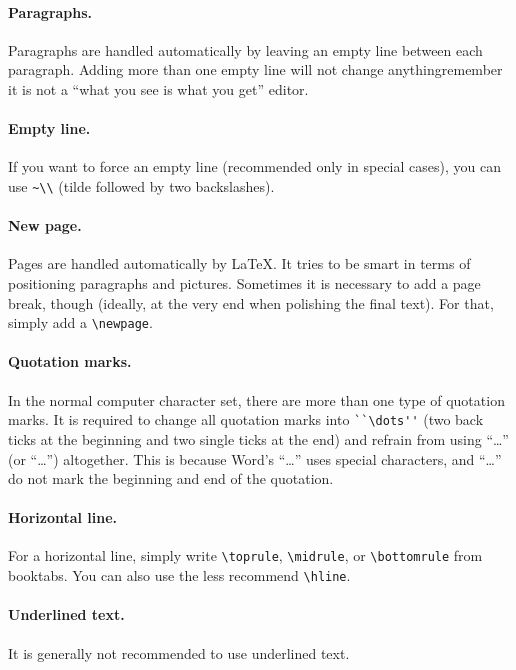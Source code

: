 \paragraph{Paragraphs.} Paragraphs are handled automatically by leaving an empty
line between each paragraph. Adding more than one empty line will not change
anything\textemdash{}remember it is not a ``what you see is what you get''
editor.

\paragraph{Empty line.} If you want to force an empty line (recommended only in
special cases), you can use \lstinline[language=Tex]!~\\! (tilde followed by two
backslashes).

\paragraph{New page.} Pages are handled automatically by \LaTeX{}. It tries to
be smart in terms of positioning paragraphs and pictures. Sometimes it is
necessary to add a page break, though (ideally, at the very end when polishing
the final text). For that, simply add a \lstinline[language=Tex]!\newpage!.

\paragraph{Quotation marks.} In the normal computer character set, there are
more than one type of quotation marks. It is required to change all quotation
marks into \lstinline[language=Tex]!``\dots''! (two back ticks at the beginning
and two single ticks at the end) and refrain from using ``\dots'' (or “\dots”)
altogether. This is because Word's “\dots” uses special characters, and ``\dots'' do not mark the beginning and end of the quotation.

\paragraph{Horizontal line.} For a horizontal line, simply write \lstinline[language=Tex]!\toprule!, \lstinline[language=Tex]!\midrule!, or \lstinline[language=Tex]!\bottomrule! from booktabs. You can also use the less recommend \lstinline[language=Tex]!\hline!. %

\paragraph{Underlined text.} It is generally not recommended to use underlined
text.


